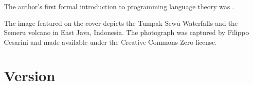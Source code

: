     The author's first formal introduction to programming language theory was \textcite{tapl}.

    The image featured on the cover depicts the Tumpak Sewu Waterfalls and the Semeru volcano in East Java, Indonesia. The photograph was captured by Filippo Cesarini and made available under the Creative Commons Zero license.

  \section*{Version}

    
